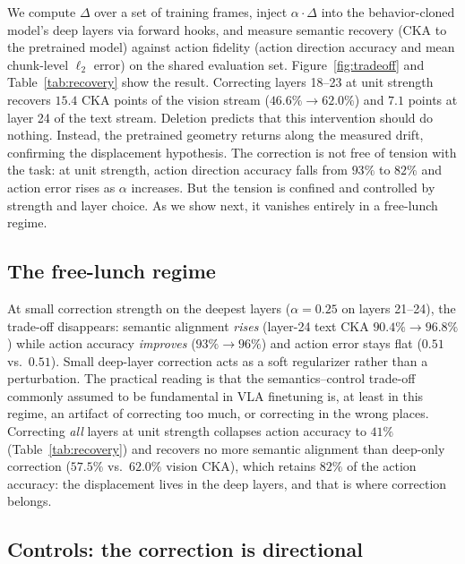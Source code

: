 \documentclass{article}
\begin{document}
We compute $\Delta$ over a set of training frames, inject $\alpha\cdot\Delta$ into the
behavior-cloned model's deep layers via forward hooks, and measure semantic recovery
(CKA to the pretrained model) against action fidelity (action direction accuracy and mean
chunk-level $\ell_2$ error) on the shared evaluation set. Figure~\ref{fig:tradeoff} and
Table~\ref{tab:recovery} show the result. Correcting layers 18--23 at unit strength recovers
$15.4$ CKA points of the vision stream ($46.6\% \rightarrow 62.0\%$) and $7.1$ points at
layer 24 of the text stream. Deletion predicts that this intervention should do nothing.
Instead, the pretrained geometry returns along the measured drift, confirming the displacement
hypothesis. The correction is not free of tension with the task: at unit
strength, action direction accuracy falls from $93\%$ to $82\%$ and action error rises as
$\alpha$ increases. But the tension is confined and controlled by strength and layer choice.
As we show next, it vanishes entirely in a free-lunch regime.

\subsection{The free-lunch regime}
\label{sec:freelunch}

At small correction strength on the deepest layers ($\alpha = 0.25$ on layers 21--24),
the trade-off disappears: semantic alignment \emph{rises} (layer-24 text CKA
$90.4\% \rightarrow 96.8\%$) while action accuracy
\emph{improves} ($93\% \rightarrow 96\%$) and action error stays flat ($0.51$ vs.\ $0.51$).
Small deep-layer correction acts as a soft regularizer rather than a perturbation. The
practical reading is that the semantics--control trade-off commonly assumed to be fundamental
in VLA finetuning is, at least in this regime, an artifact of correcting too much, or
correcting in the wrong places. Correcting \emph{all} layers at unit strength collapses action
accuracy to $41\%$ (Table~\ref{tab:recovery}) and recovers no more semantic alignment than
deep-only correction ($57.5\%$ vs.\ $62.0\%$ vision CKA), which retains $82\%$ of the action
accuracy: the displacement lives in the deep layers, and that is where correction belongs.

\subsection{Controls: the correction is directional}
\label{sec:controls}
\end{document}
